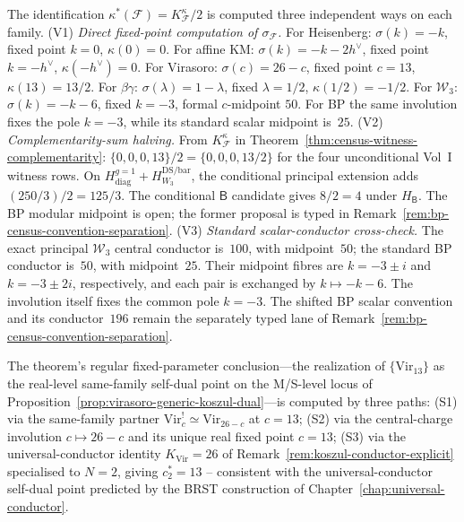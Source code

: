 \begin{remark}
\label{rem:self-dual-locus-verification}
The identification $\kappa^*(\mathcal{F}) = K^\kappa_\mathcal{F}/2$
is computed three independent ways on each family.
\textup{(V1)} \emph{Direct fixed-point computation of
$\sigma_\mathcal{F}$.} For Heisenberg:
$\sigma(k) = -k$, fixed point $k = 0$, $\kappa(0) = 0$. For affine KM:
$\sigma(k) = -k - 2h^\vee$, fixed point $k = -h^\vee$,
$\kappa(-h^\vee) = 0$. For Virasoro: $\sigma(c) = 26 - c$, fixed
point $c = 13$, $\kappa(13) = 13/2$. For
$\beta\gamma$: $\sigma(\lambda) = 1 - \lambda$, fixed
$\lambda = 1/2$, $\kappa(1/2) = -1/2$. For $\mathcal{W}_3$:
$\sigma(k) = -k - 6$, fixed $k = -3$, formal
$c$-midpoint $50$. For BP the same involution fixes the pole $k=-3$,
while its standard scalar midpoint is~$25$.
\textup{(V2)} \emph{Complementarity-sum halving.}
From $K^\kappa_\mathcal{F}$ in
Theorem~\ref{thm:census-witness-complementarity}:
$\{0,0,0,13\}/2=\{0,0,0,13/2\}$ for the four unconditional
Vol~I witness rows.  On
$H_{\mathrm{diag}}^{g=1}+H_{W_3}^{\mathrm{DS/bar}}$, the conditional
principal extension adds $(250/3)/2=125/3$.
The conditional $\mathsf B$ candidate gives $8/2=4$ under
$H_{\mathsf B}$.  The BP
modular midpoint is open; the former proposal is typed
\ClaimStatusConjectured in
Remark~\ref{rem:bp-census-convention-separation}. \textup{(V3)}
\emph{Standard scalar-conductor cross-check.}  The exact principal
$\mathcal W_3$ central conductor is~$100$, with midpoint~$50$; the standard
BP conductor is~$50$, with midpoint~$25$.  Their midpoint fibres are
$k=-3\pm i$ and $k=-3\pm2i$, respectively, and each pair is exchanged
by $k\mapsto-k-6$.  The involution itself fixes the common pole
$k=-3$.  The shifted BP scalar convention and its conductor~$196$
remain the separately typed lane of
Remark~\ref{rem:bp-census-convention-separation}.

The theorem's regular fixed-parameter conclusion---the realization of
$\{\mathrm{Vir}_{13}\}$ as the real-level same-family self-dual point
on the M/S-level locus of
Proposition~\ref{prop:virasoro-generic-koszul-dual}---is computed by
three paths:
\textup{(S1)} via the same-family partner
$\mathrm{Vir}_c^! \simeq \mathrm{Vir}_{26-c}$ at $c = 13$;
\textup{(S2)} via the central-charge involution $c \mapsto 26 - c$ and
its unique real fixed point $c = 13$;
\textup{(S3)} via the universal-conductor identity
$K_{\mathrm{Vir}} = 26$ of
Remark~\ref{rem:koszul-conductor-explicit} specialised to $N = 2$,
giving $c^*_2 = 13$ -- consistent with the universal-conductor
self-dual point predicted by the BRST construction of
Chapter~\ref{chap:universal-conductor}.
\end{remark}

